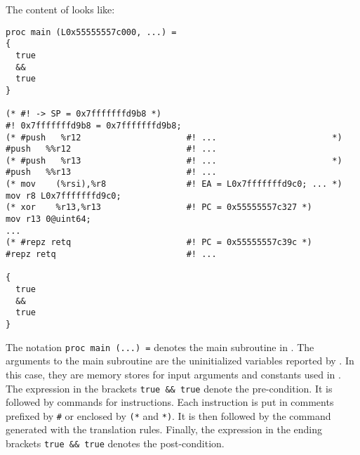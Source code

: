 \documentclass{amsproc}
\begin{document}
The content of \nistzaddcl looks like:
\begin{verbatim}
proc main (L0x55555557c000, ...) =
{
  true
  &&
  true
}

(* #! -> SP = 0x7fffffffd9b8 *)
#! 0x7fffffffd9b8 = 0x7fffffffd9b8;
(* #push   %r12                     #! ...                       *)
#push   %%r12                       #! ...
(* #push   %r13                     #! ...                       *)
#push   %%r13                       #! ...
(* mov    (%rsi),%r8                #! EA = L0x7fffffffd9c0; ... *)
mov r8 L0x7fffffffd9c0;
(* xor    %r13,%r13                 #! PC = 0x55555557c327 *)
mov r13 0@uint64;
...
(* #repz retq                       #! PC = 0x55555557c39c *)
#repz retq                          #! ...

{
  true
  &&
  true
}
\end{verbatim}
The notation \texttt{proc main (...) =} denotes the main subroutine in
\cryptoline. The arguments to the main subroutine are the
uninitialized variables reported by \tozdsl. In this case, they are
memory stores for input arguments and constants used in \nistzadd. The
expression in the brackets \texttt{true \&\& true} denote the
pre-condition. It is followed by \cryptoline commands for \xeightysix
instructions. Each \xeightysix instruction is put in \cryptoline
comments prefixed by \texttt{\#} or enclosed by \texttt{(*} and
\texttt{*)}. It is then followed by the \cryptoline command generated
with the translation rules. Finally, the expression in the ending
brackets \texttt{true \&\& true} denotes the post-condition.
\end{document}
